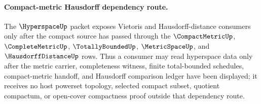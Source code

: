 \paragraph{Compact-metric Hausdorff dependency route.}
The $\HyperspaceUp$ packet exposes Vietoris and Hausdorff-distance consumers only after the compact source has passed through the $\CompactMetricUp$, $\CompleteMetricUp$, $\TotallyBoundedUp$, $\MetricSpaceUp$, and $\HausdorffDistanceUp$ rows. Thus a consumer may read hyperspace data only after the metric carrier, completeness witness, finite total-bounded schedules, compact-metric handoff, and Hausdorff comparison ledger have been displayed; it receives no host powerset topology, selected compact subset, quotient compactum, or open-cover compactness proof outside that dependency route.
